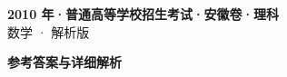 \documentclass[zihao=-4, a4paper]{ctexart}
\begin{document}
\begin{center}
  {\Large\bfseries 2010 年·普通高等学校招生考试·安徽卷·理科}\\[4pt]
  {\large 数学 · 解析版}
\end{center}
\medskip
{}

\clearpage
{}
\begin{center}{\Large\bfseries 参考答案与详细解析}\end{center}
\medskip

\end{document}
